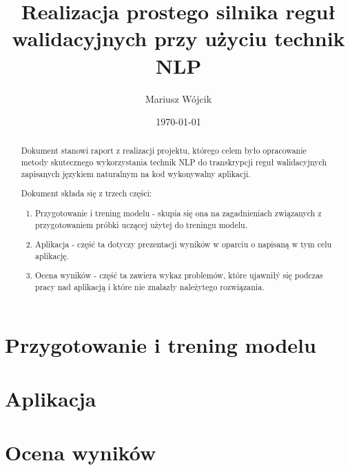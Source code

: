 \documentclass[10pt, a4paper, twoside, titlepage]{report}
\title{Realizacja prostego silnika reguł walidacyjnych przy użyciu technik NLP}
\author{Mariusz Wójcik
}
\date{\today}
\begin{document}
	\maketitle
	
	
	\begin{abstract}
	Dokument stanowi raport z realizacji projektu, którego celem było opracowanie metody skutecznego  wykorzystania technik NLP do transkrypcji reguł walidacyjnych zapisanych językiem naturalnym na kod wykonywalny aplikacji.
	
	Dokument składa się z trzech części:
	\begin{enumerate}
		\item Przygotowanie i trening modelu - skupia się ona na zagadnieniach związanych z przygotowaniem próbki uczącej użytej do treningu modelu. 
		\item Aplikacja - część ta dotyczy prezentacji wyników w oparciu o napisaną w tym celu aplikację. 
		\item Ocena wyników - część ta zawiera wykaz problemów, które ujawniłý się podczas pracy nad aplikacją i które nie znalazły należytego rozwiązania.
	\end{enumerate}
	\end{abstract}
	
	
	\tableofcontents
	
   \noindent	
	\part{Przygotowanie i trening modelu}
	
	
	
	
	
	\part{Aplikacja}
	
	
	
	\part{Ocena wyników}
	

%	






	
\end{document}
